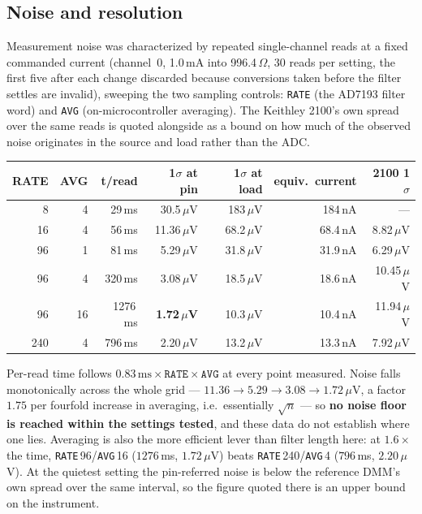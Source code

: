 \documentclass[11pt]{article}
\begin{document}
\subsection{Noise and resolution}
\label{sec:noise}
Measurement noise was characterized by repeated single-channel reads at a fixed
commanded current (channel~0, 1.0\,mA into 996.4\,$\Omega$, 30 reads per
setting, the first five after each change discarded because conversions taken
before the filter settles are invalid), sweeping the two sampling controls: \texttt{RATE} (the AD7193 filter
word) and \texttt{AVG} (on-microcontroller averaging). The Keithley 2100's own
spread over the same reads is quoted alongside as a bound on how much of the
observed noise originates in the source and load rather than the ADC.

\medskip
\noindent\begin{tabular}{@{}rrrrrrr@{}}
\toprule
\textbf{RATE} & \textbf{AVG} & \textbf{t/read} & \textbf{1$\sigma$ at pin} & \textbf{1$\sigma$ at load} & \textbf{equiv.\ current} & \textbf{2100 1$\sigma$} \\
\midrule
8   & 4  & 29\,ms   & 30.5\,$\mu$V & 183\,$\mu$V & 184\,nA & --- \\
16  & 4  & 56\,ms   & 11.36\,$\mu$V & 68.2\,$\mu$V & 68.4\,nA & 8.82\,$\mu$V \\
96  & 1  & 81\,ms   & 5.29\,$\mu$V & 31.8\,$\mu$V & 31.9\,nA & 6.29\,$\mu$V \\
96  & 4  & 320\,ms  & 3.08\,$\mu$V & 18.5\,$\mu$V & 18.6\,nA & 10.45\,$\mu$V \\
96  & 16 & 1276\,ms & \textbf{1.72\,$\mu$V} & 10.3\,$\mu$V & 10.4\,nA & 11.94\,$\mu$V \\
240 & 4  & 796\,ms  & 2.20\,$\mu$V & 13.2\,$\mu$V & 13.3\,nA & 7.92\,$\mu$V \\
\bottomrule
\end{tabular}
\medskip

Per-read time follows $0.83\,\text{ms}\times\texttt{RATE}\times\texttt{AVG}$ at
every point measured. Noise falls monotonically across the whole grid ---
$11.36\to5.29\to3.08\to1.72\,\mu$V, a factor $1.75$ per fourfold increase in
averaging, i.e.\ essentially $\sqrt{n}$ --- so \textbf{no noise floor is reached
within the settings tested}, and these data do not establish where one lies.
Averaging is also the more efficient lever than filter length here: at $1.6\times$
the time, \texttt{RATE}\,96/\texttt{AVG}\,16 ($1276$\,ms, $1.72\,\mu$V) beats
\texttt{RATE}\,240/\texttt{AVG}\,4 ($796$\,ms, $2.20\,\mu$V). At the quietest
setting the pin-referred noise is below the reference DMM's own spread over the
same interval, so the figure quoted there is an upper bound on the instrument.
\end{document}
